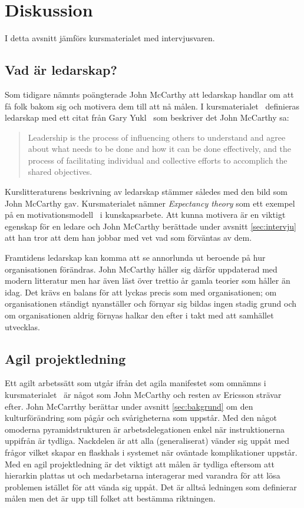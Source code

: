 \section{Diskussion}

I detta avsnitt jämförs kursmaterialet med intervjusvaren.

\subsection{Vad är ledarskap?}
Som tidigare nämnts poängterade John McCarthy att ledarskap handlar om att få folk bakom sig och motivera dem till att nå målen. I kursmaterialet~\citep{leadership} definieras ledarskap med ett citat från Gary Yukl~\citep{yukl} som beskriver det John McCarthy sa:
\begin{quote}
Leadership is the process of influencing others to understand 
and agree about what needs to be done and how it can be 
done effectively, and the process of facilitating individual and 
collective efforts to accomplich the shared objectives.
\end{quote}

Kurslitteraturens beskrivning av ledarskap stämmer således med den bild som John McCarthy gav. Kursmaterialet nämner \textit{Expectancy theory} som ett exempel på en motivationsmodell~\cite{motivation} i kunskapsarbete. Att kunna motivera är en viktigt egenskap för en ledare och John McCarthy berättade under avsnitt \ref{sec:intervju} att han tror att dem han jobbar med vet vad som förväntas av dem.

Framtidens ledarskap kan komma att se annorlunda ut beroende på hur organisationen förändras. John McCarthy håller sig därför uppdaterad med modern litteratur men har även läst över trettio år gamla teorier som håller än idag. Det krävs en balans för att lyckas precis som med organisationen; om organisationen ständigt nyanställer och förnyar sig bildas ingen stadig grund och om organisationen aldrig förnyas halkar den efter i takt med att samhället utvecklas.

\subsection{Agil projektledning}
Ett agilt arbetssätt som utgår ifrån det agila manifestet som omnämns i kursmaterialet~\citep{projekt} är något som John McCarthy och resten av Ericsson strävar efter. John McCarrthy berättar under avsnitt \ref{sec:bakgrund} om den kulturförändring som pågår och svårigheterna som uppstår. Med den något omoderna pyramidstrukturen är arbetsdelegationen enkel när instruktionerna uppifrån är tydliga. Nackdelen är att alla (generaliserat) vänder sig uppåt med frågor vilket skapar en flaskhals i systemet när oväntade komplikationer uppstår. Med en agil projektledning är det viktigt att målen är tydliga eftersom att hierarkin plattas ut och medarbetarna interagerar med varandra för att lösa problemen istället för att vända sig uppåt. Det är alltså ledningen som definierar målen men det är upp till folket att bestämma riktningen.

